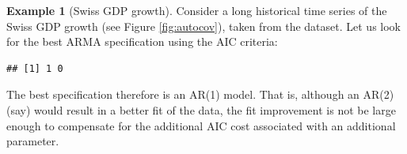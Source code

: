 \documentclass[
  12pt,
]{book}
\newenvironment{Shaded}{\begin{snugshade}}{\end{snugshade}}
\newcommand{\AttributeTok}[1]{\textcolor[rgb]{0.77,0.63,0.00}{#1}}
\newcommand{\CommentTok}[1]{\textcolor[rgb]{0.56,0.35,0.01}{\textit{#1}}}
\newcommand{\ConstantTok}[1]{\textcolor[rgb]{0.00,0.00,0.00}{#1}}
\newcommand{\ControlFlowTok}[1]{\textcolor[rgb]{0.13,0.29,0.53}{\textbf{#1}}}
\newcommand{\DecValTok}[1]{\textcolor[rgb]{0.00,0.00,0.81}{#1}}
\newcommand{\FunctionTok}[1]{\textcolor[rgb]{0.00,0.00,0.00}{#1}}
\newcommand{\NormalTok}[1]{#1}
\newcommand{\OtherTok}[1]{\textcolor[rgb]{0.56,0.35,0.01}{#1}}
\newcommand{\SpecialCharTok}[1]{\textcolor[rgb]{0.00,0.00,0.00}{#1}}
\newcommand{\StringTok}[1]{\textcolor[rgb]{0.31,0.60,0.02}{#1}}
\theoremstyle{definition}
\theoremstyle{definition}
\newtheorem{example}{Example}[chapter]
\theoremstyle{definition}
\theoremstyle{definition}
\theoremstyle{remark}
\begin{document}
\begin{example}[Swiss GDP growth]
\protect\hypertarget{exm:SwissGrowthAIC}{}\label{exm:SwissGrowthAIC}Consider a long historical time series of the Swiss GDP growth (see Figure \ref{fig:autocov}), taken from the \citet{JST_2017} dataset. Let us look for the best ARMA specification using the AIC criteria:

\begin{Shaded}
\end{Shaded}

\begin{verbatim}
## [1] 1 0
\end{verbatim}

The best specification therefore is an AR(1) model. That is, although an AR(2) (say) would result in a better fit of the data, the fit improvement is not be large enough to compensate for the additional AIC cost associated with an additional parameter.
\end{example}
\end{document}
